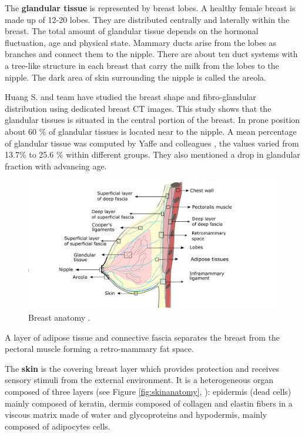 The \textbf{ glandular tissue} is represented by breast lobes. A healthy female breast is made up of 12-20 lobes. They are distributed centrally and laterally within the breast. The total amount of glandular tissue depends on the hormonal fluctuation, age and physical state.  Mammary ducts arise from the lobes as branches and connect them to the nipple. There are about ten duct systems with a tree-like structure in each breast that carry the milk from the lobes to the nipple. The dark area of skin surrounding the nipple is called the areola.

Huang S. and team  \citep{huang2011characterization} have studied the breast shape and fibro-glandular distribution using dedicated breast CT images. This study shows that the glandular tissues is situated in the central portion of the breast. In prone position about 60 $\%$ of glandular tissues is located near to the nipple. A mean percentage of glandular tissue was computed by Yaffe and colleagues \citep{yaffe2009myth}, the values varied from 13.7$\%$ to 25.6 $\%$ within different groups. They also mentioned a drop in glandular fraction with advancing age. 


\begin{center}
\begin{figure}[h]
\includegraphics[width=\textwidth,keepaspectratio]{figures/anatomieSeinEuBlack2.png} 
\caption{Breast anatomy \citep{clemente2011anatomy}.}
\label{fig:breastanatomy}
\end{figure}
\end{center}

 A layer of adipose tissue and connective fascia separates the breast from the pectoral muscle forming a retro-mammary fat space.
 
The \textbf{skin} is the covering breast layer which provides protection and receives sensory stimuli from the external environment. It is a heterogeneous organ composed of three layers (see Figure \ref{fig:skinanatomy}, \citep{kanitakis2002anatomy}): epidermis (dead cells) mainly composed of keratin, dermis composed of collagen and elastin fibers in a viscous matrix made of water and glycoproteins and hypodermis, mainly composed of adipocytes cells.


